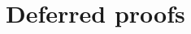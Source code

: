 


























































































































\setcounter{thm}{57}\appendix
\section{Deferred proofs}\label{sec:def_proofs}

